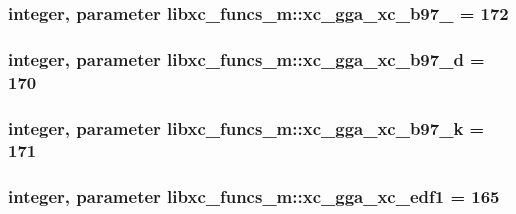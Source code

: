 \hypertarget{classlibxc__funcs__m_a94830c0f4373270fc84e48b94a4e4169}{
\subsubsection[{xc\-\_\-gga\-\_\-xc\-\_\-b97\-\_\-3}]{\setlength{\rightskip}{0pt plus 5cm}integer, parameter libxc\-\_\-funcs\-\_\-m\-::xc\-\_\-gga\-\_\-xc\-\_\-b97\-\_ = 172}}\label{classlibxc__funcs__m_a94830c0f4373270fc84e48b94a4e4169}
\hypertarget{classlibxc__funcs__m_a7c432d893c41df9829cd1aef99120c7f}{
\subsubsection[{xc\-\_\-gga\-\_\-xc\-\_\-b97\-\_\-d}]{\setlength{\rightskip}{0pt plus 5cm}integer, parameter libxc\-\_\-funcs\-\_\-m\-::xc\-\_\-gga\-\_\-xc\-\_\-b97\-\_\-d = 170}}\label{classlibxc__funcs__m_a7c432d893c41df9829cd1aef99120c7f}
\hypertarget{classlibxc__funcs__m_a814fc12334d925edd13cab81e3eb851a}{
\subsubsection[{xc\-\_\-gga\-\_\-xc\-\_\-b97\-\_\-k}]{\setlength{\rightskip}{0pt plus 5cm}integer, parameter libxc\-\_\-funcs\-\_\-m\-::xc\-\_\-gga\-\_\-xc\-\_\-b97\-\_\-k = 171}}\label{classlibxc__funcs__m_a814fc12334d925edd13cab81e3eb851a}
\hypertarget{classlibxc__funcs__m_aedd9913cc669f93ecaeafee0cb9d8042}{
\subsubsection[{xc\-\_\-gga\-\_\-xc\-\_\-edf1}]{\setlength{\rightskip}{0pt plus 5cm}integer, parameter libxc\-\_\-funcs\-\_\-m\-::xc\-\_\-gga\-\_\-xc\-\_\-edf1 = 165}}\label{classlibxc__funcs__m_aedd9913cc669f93ecaeafee0cb9d8042}

